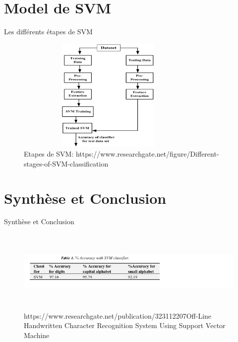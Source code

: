 \documentclass{beamer}
\begin{document}
\section{Model de SVM }
\begin{frame}{Les différents étapes de SVM } 
\begin{figure}[H]
    \includegraphics[width=9cm,height=5.5cm]{images/svm_methode.png}
    \caption{Etapes de SVM: https://www.researchgate.net/figure/Different-stages-of-SVM-classification}
    \label{fig:L1}
\end{figure}
\end{frame}


\section{Synthèse et Conclusion}
\begin{frame}{Synthèse et Conclusion}
\begin{figure}[H]
    \includegraphics[width=15cm,height=4cm]{images/accuracy.png}
    \caption{https://www.researchgate.net/publication/323112207Off-Line Handwritten Character Recognition System Using Support Vector Machine}
    \label{fig:L1}
\end{figure}
\end{frame}
\end{document}
